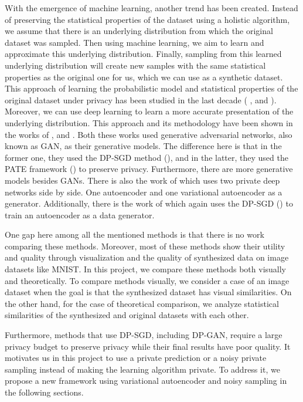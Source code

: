 \documentclass{article}
\begin{document}
With the emergence of machine learning, another trend has been created. Instead of preserving the statistical properties of the dataset using a holistic algorithm, we assume that there is an underlying distribution from which the original dataset was sampled. Then using machine learning, we aim to learn and approximate this underlying distribution. Finally, sampling from this learned underlying distribution will create new samples with the same statistical properties as the original one for us, which we can use as a synthetic dataset. This approach of learning the probabilistic model and statistical properties of the original dataset under privacy has been studied in the last decade ( \cite{zhang2016privtree}, and \cite{zhang2017privbayes}). Moreover, we can use deep learning to learn a more accurate presentation of the underlying distribution. This approach and its methodology have been shown in the works of \cite{xie2018differentially}, and \cite{jordon2018pate}. Both these works used generative adversarial networks, also known as GAN, as their generative models. The difference here is that in the former one, they used the DP-SGD method (\cite{abadi2016deep}), and in the latter, they used the PATE framework (\cite{papernot2016semi}) to preserve privacy. Furthermore, there are more generative models besides GANs. There is also the work of \cite{chen2018differentially} which uses two private deep networks side by side. One autoencoder and one variational autoencoder as a generator. Additionally, there is the work of \cite{takahashi2020differentially} which again uses the DP-SGD (\cite{abadi2016deep}) to train an autoencoder as a data generator.

One gap here among all the mentioned methods is that there is no work comparing these methods. Moreover, most of these methods show their utility and quality through visualization and the quality of synthesized data on image datasets like MNIST. In this project, we compare these methods both visually and theoretically. To compare methods visually, we consider a case of an image dataset when the goal is that the synthesized dataset has visual similarities. On the other hand, for the case of theoretical comparison, we analyze statistical similarities of the synthesized and original datasets with each other.

Furthermore, methods that use DP-SGD, including DP-GAN, require a large privacy budget to preserve privacy while their final results have poor quality. It motivates us in this project to use a private prediction or a noisy private sampling instead of making the learning algorithm private. To address it, we propose a new framework using variational autoencoder and noisy sampling in the following sections.
\end{document}
